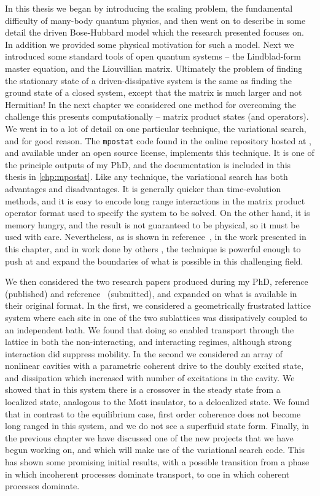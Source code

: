 In this thesis we began by introducing the scaling problem, the fundamental difficulty of many-body quantum physics, and then went on to describe in some detail the driven Bose-Hubbard model which the research presented focuses on. In addition we provided some physical motivation for such a model. Next we introduced some standard tools of open quantum systems -- the Lindblad-form master equation, and the Liouvillian matrix. Ultimately the problem of finding the stationary state of a driven-dissipative system is the same as finding the ground state of a closed system, except that the matrix is much larger and not Hermitian! In the next chapter we considered one method for overcoming the challenge this presents computationally -- matrix product states (and operators). We went in to a lot of detail on one particular technique, the variational search, and for good reason. The \lstinline$mpostat$ code found in the online repository hosted at \cite{otb:gitVSSS}, and available under an open source license, implements this technique. It is one of the principle outputs of my PhD, and the documentation is included in this thesis in \cref{chp:mpostat}. Like any technique, the variational search has both advantages and disadvantages. It is generally quicker than time-evolution methods, and it is easy to encode long range interactions in the matrix product operator format used to specify the system to be solved. On the other hand, it is memory hungry, and the result is not guaranteed to be physical, so it must be used with care. Nevertheless, as is shown in reference~\cite{Owen2017}, in the work presented in this chapter, and in work done by others \cite{Cui2015,Mascarenhas2015}, the technique is powerful enough to push at and expand the boundaries of what is possible in this challenging field.

We then considered the two research papers produced during my PhD, reference~\cite{Owen2017} (published) and reference~\cite{Brown2018} (submitted), and expanded on what is available in their original format. In the first, we considered a geometrically frustrated lattice system where each site in one of the two sublattices was dissipatively coupled to an independent bath. We found that doing so enabled transport through the lattice in both the non-interacting, and interacting regimes, although strong interaction did suppress mobility. In the second we considered an array of nonlinear cavities with a parametric coherent drive to the doubly excited state, and dissipation which increased with number of excitations in the cavity. We showed that in this system there is a crossover in the steady state from a localized state, analogous to the Mott insulator, to a delocalized state. We found that in contrast to the equilibrium case, first order coherence does not become long ranged in this system, and we do not see a superfluid state form. Finally, in the previous chapter we have discussed one of the new projects that we have begun working on, and which will make use of the variational search code. This has shown some promising initial results, with a possible transition from a phase in which incoherent processes dominate transport, to one in which coherent processes dominate.

